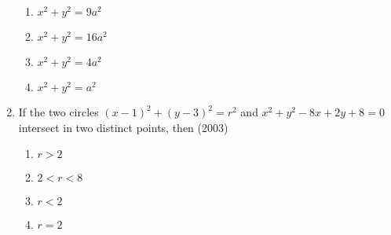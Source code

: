 \documentclass[journal,12pt,twocolumn]{IEEEtran}
\theoremstyle{remark}
\begin{document}
\begin{enumerate}
\begin{enumerate}
\item$x^2+y^2=9a^2$\\
\item$x^2+y^2=16a^2$\\
\item$x^2+y^2=4a^2$\\
\item$x^2+y^2=a^2$\\
\end{enumerate}
\item If the two circles $(x-1)^2+(y-3)^2=r^2$ and $x^2+y^2-8x+2y+8=0$ intersect in two distinct points, then \hfill{(2003)}\\
\begin{enumerate}
\item$r>2$\\
\item$2<r<8$\\
\item$r<2$\\
\item$r=2$
\end{enumerate}
\end{enumerate}
\end{document}
